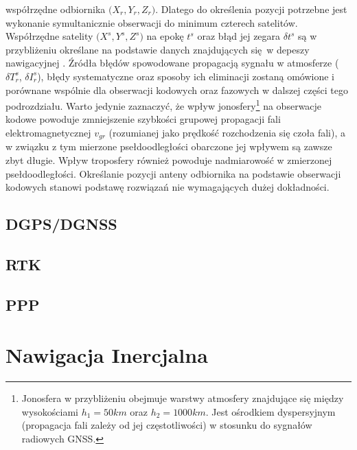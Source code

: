 współrzędne odbiornika $\big(X_r, Y_r, Z_r\big)$. Dlatego do określenia pozycji potrzebne jest wykonanie symultanicznie obserwacji do 
minimum czterech satelitów. Współrzędne satelity $\big(X^s, Y^s, Z^s\big)$ na epokę $t^s$ oraz błąd jej zegara ${\delta}t^s$ są w 
przybliżeniu określane na podstawie danych znajdujących się w depeszy nawigacyjnej \cite[][strona 11]{BOSY_2005}.
Źródła błędów spowodowane propagacją sygnału w atmosferze (${\delta}T_r^s$, ${\delta}I_r^s$), błędy systematyczne oraz sposoby ich eliminacji 
zostaną omówione i porównane wspólnie dla obserwacji kodowych oraz fazowych w dalszej części tego podrozdziału. Warto jedynie zaznaczyć, że wpływ jonosfery\footnote{
Jonosfera w przybliżeniu obejmuje warstwy atmosfery znajdujące się między wysokościami $h_1 = 50km$ oraz $h_2 = 1000km$. Jest ośrodkiem dyspersyjnym (propagacja 
fali zależy od jej częstotliwości) w stosunku do sygnałów radiowych GNSS.} 
na obserwacje kodowe powoduje zmniejszenie szybkości grupowej propagacji fali elektromagnetycznej $v_{gr}$ (rozumianej jako prędkość rozchodzenia się czoła fali), a 
w związku z tym mierzone psełdoodległości obarczone jej wpływem są zawsze zbyt długie. Wpływ troposfery również powoduje nadmiarowość w zmierzonej psełdoodległości.  
Określanie pozycji anteny odbiornika na podstawie obserwacji kodowych stanowi podstawę rozwiązań nie wymagających dużej dokładności.\newline
\indent 
	\subsection{DGPS/DGNSS}
	\subsection{RTK}
	\subsection{PPP}
\section{Nawigacja Inercjalna}
